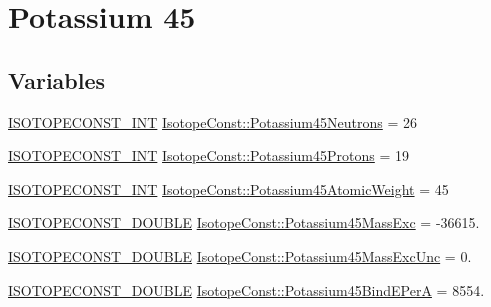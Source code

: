 \hypertarget{group___isotope_const-_potassium-_k45}{}\section{Potassium 45}
\label{group___isotope_const-_potassium-_k45}
\subsection*{Variables}
\begin{DoxyCompactItemize}
\item 
\mbox{\hyperlink{group___isotope_const-_macros_ga5f18360b3e99483a35c32d789e62621c}{I\+S\+O\+T\+O\+P\+E\+C\+O\+N\+S\+T\+\_\+\+I\+NT}} \mbox{\hyperlink{group___isotope_const-_potassium-_k45_ga3b7d3d1ecbb844aa5898ca72fa20d646}{Isotope\+Const\+::\+Potassium45\+Neutrons}} = 26
\item 
\mbox{\hyperlink{group___isotope_const-_macros_ga5f18360b3e99483a35c32d789e62621c}{I\+S\+O\+T\+O\+P\+E\+C\+O\+N\+S\+T\+\_\+\+I\+NT}} \mbox{\hyperlink{group___isotope_const-_potassium-_k45_gabbced0f14fd86cad848763cadf9f3087}{Isotope\+Const\+::\+Potassium45\+Protons}} = 19
\item 
\mbox{\hyperlink{group___isotope_const-_macros_ga5f18360b3e99483a35c32d789e62621c}{I\+S\+O\+T\+O\+P\+E\+C\+O\+N\+S\+T\+\_\+\+I\+NT}} \mbox{\hyperlink{group___isotope_const-_potassium-_k45_gaa9fdc5bc26ddb42639f1bc5aac03b3cb}{Isotope\+Const\+::\+Potassium45\+Atomic\+Weight}} = 45
\item 
\mbox{\hyperlink{group___isotope_const-_macros_ga8f45a7272ce02c0b4c65c44636ed719a}{I\+S\+O\+T\+O\+P\+E\+C\+O\+N\+S\+T\+\_\+\+D\+O\+U\+B\+LE}} \mbox{\hyperlink{group___isotope_const-_potassium-_k45_gaa8e3ed98c9a9b88cd99843bd8a43a698}{Isotope\+Const\+::\+Potassium45\+Mass\+Exc}} = -\/36615.
\item 
\mbox{\hyperlink{group___isotope_const-_macros_ga8f45a7272ce02c0b4c65c44636ed719a}{I\+S\+O\+T\+O\+P\+E\+C\+O\+N\+S\+T\+\_\+\+D\+O\+U\+B\+LE}} \mbox{\hyperlink{group___isotope_const-_potassium-_k45_ga9a32d4db243f8490e4954a5c9d9e9b9a}{Isotope\+Const\+::\+Potassium45\+Mass\+Exc\+Unc}} = 0.
\item 
\mbox{\hyperlink{group___isotope_const-_macros_ga8f45a7272ce02c0b4c65c44636ed719a}{I\+S\+O\+T\+O\+P\+E\+C\+O\+N\+S\+T\+\_\+\+D\+O\+U\+B\+LE}} \mbox{\hyperlink{group___isotope_const-_potassium-_k45_gab553fef1ed3f6538f872302d9aad01eb}{Isotope\+Const\+::\+Potassium45\+Bind\+E\+PerA}} = 8554.
\item 

\end{DoxyCompactItemize}
